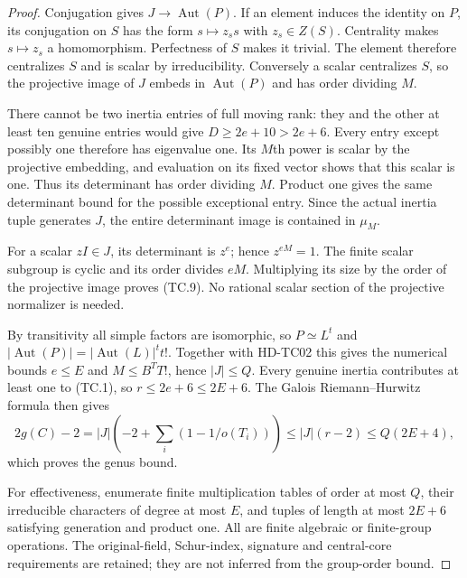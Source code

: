 \begin{proof}
Conjugation gives $J\to\operatorname{Aut}(P)$.
If an element induces the identity on $P$, its conjugation
on $S$ has the form $s\mapsto z_s s$ with $z_s\in Z(S)$.
Centrality makes $s\mapsto z_s$ a homomorphism. Perfectness
of $S$ makes it trivial. The element therefore centralizes
$S$ and is scalar by irreducibility. Conversely a scalar
centralizes $S$, so the projective image of $J$ embeds in
$\operatorname{Aut}(P)$ and has order dividing $M$.

There cannot be two inertia entries of full moving rank:
they and the other at least ten genuine entries would
give $D\ge2e+10>2e+6$. Every entry except possibly one
therefore has eigenvalue one. Its $M$th power is scalar
by the projective embedding, and evaluation on its fixed
vector shows that this scalar is one. Thus its determinant
has order dividing $M$. Product one gives the same
determinant bound for the possible exceptional entry.
Since the actual inertia tuple generates $J$, the entire
determinant image is contained in $\mu_M$.

For a scalar $zI\in J$, its determinant is $z^e$; hence
$z^{eM}=1$. The finite scalar subgroup is cyclic and its
order divides $eM$. Multiplying its size by the order of
the projective image proves (TC.9). No rational scalar
section of the projective normalizer is needed.

By transitivity all simple factors are isomorphic, so
$P\simeq L^t$ and
$|\operatorname{Aut}(P)|=|\operatorname{Aut}(L)|^t t!$.
Together with HD-TC02 this gives the numerical bounds
$e\le E$ and $M\le B^T T!$, hence $|J|\le Q$.
Every genuine inertia contributes at least one to (TC.1),
so $r\le2e+6\le2E+6$. The Galois Riemann--Hurwitz formula
then gives
\[
 2g(C)-2=|J|\left(-2+\sum_i(1-1/o(T_i))\right)
              \le |J|(r-2)\le Q(2E+4),                  \tag{TC.12}
\]
which proves the genus bound.

For effectiveness, enumerate finite multiplication tables
of order at most $Q$, their irreducible characters of degree
at most $E$, and tuples of length at most $2E+6$ satisfying
generation and product one. All are finite algebraic or
finite-group operations. The original-field, Schur-index,
signature and central-core requirements are retained; they
are not inferred from the group-order bound.


\end{proof}
